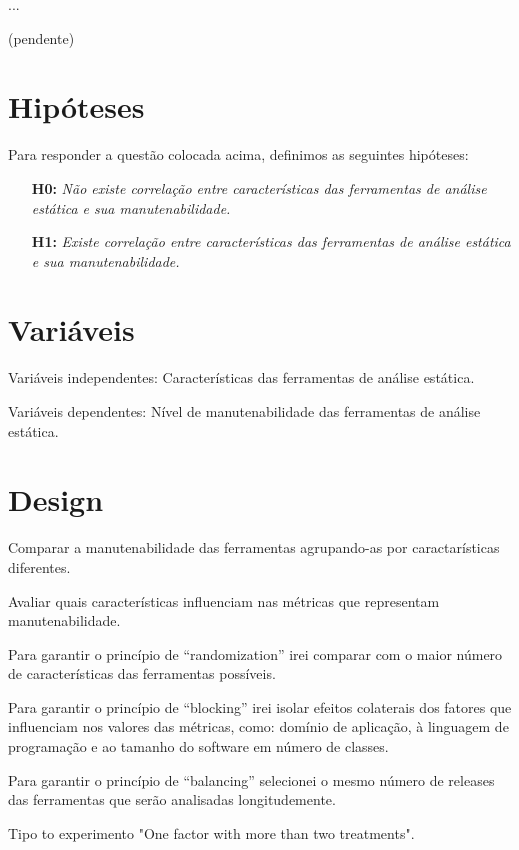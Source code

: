 {...}
\label{planejamento}

(pendente)

\section{Hipóteses} \label{hipoteses}

Para responder a questão colocada acima, definimos as seguintes hipóteses:

\begin{enumerate}
  \item[{\bf H0:}] {\em Não existe correlação entre características das
  ferramentas de análise estática e sua manutenabilidade.}
  \item[{\bf H1:}] {\em Existe correlação entre características das ferramentas
  de análise estática e sua manutenabilidade.}
\end{enumerate}

\section{Variáveis}

Variáveis independentes: Características das ferramentas de análise estática.

Variáveis dependentes: Nível de manutenabilidade das ferramentas de análise estática.

\section{Design}

Comparar a manutenabilidade das ferramentas agrupando-as por caractarísticas diferentes.

Avaliar quais características influenciam nas métricas que representam manutenabilidade.

Para garantir o princípio de ``randomization'' irei comparar com o maior número
de características das ferramentas possíveis.

Para garantir o princípio de ``blocking'' irei isolar efeitos colaterais dos
fatores que influenciam nos valores das métricas, como: domínio de aplicação, à
linguagem de programação e ao tamanho do software em número de classes.

Para garantir o princípio de ``balancing'' selecionei o mesmo número de
releases das ferramentas que serão analisadas longitudemente.

Tipo to experimento "One factor with more than two treatments".

